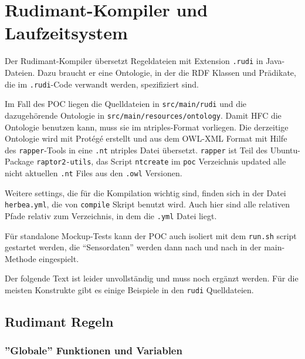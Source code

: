 \section{Rudimant-Kompiler und Laufzeitsystem}

Der Rudimant-Kompiler übersetzt Regeldateien mit Extension \texttt{.rudi} in
Java-Dateien. Dazu braucht er eine Ontologie, in der die RDF Klassen und
Prädikate, die im \texttt{.rudi}-Code verwandt werden, spezifiziert sind.

Im Fall des POC liegen die Quelldateien in \texttt{src/main/rudi} und die
dazugehörende Ontologie in \texttt{src/main/resources/ontology}. Damit HFC
die Ontologie benutzen kann, muss sie im ntriples-Format vorliegen. Die
derzeitige Ontologie wird mit Protégé erstellt und aus dem OWL-XML Format
mit Hilfe des \texttt{rapper}-Tools in eine \texttt{.nt} ntriples Datei
übersetzt. \texttt{rapper} ist Teil des Ubuntu-Package \texttt{raptor2-utils},
das Script \texttt{ntcreate} im \texttt{poc} Verzeichnis updated alle nicht
aktuellen \texttt{.nt} Files aus den \texttt{.owl} Versionen.

Weitere settings, die für die Kompilation wichtig sind, finden sich in der
Datei \texttt{herbea.yml}, die von \texttt{compile} Skript benutzt wird. Auch
hier sind alle relativen Pfade relativ zum Verzeichnis, in dem die
\texttt{.yml} Datei liegt.

Für standalone Mockup-Tests kann der POC auch isoliert mit dem \texttt{run.sh}
script gestartet werden, die ``Sensordaten'' werden dann nach und nach in
der main-Methode eingespielt.

Der folgende Text ist leider unvollständig und muss noch ergänzt werden. Für
die meisten Konstrukte gibt es einige Beispiele in den \texttt{rudi}
Quelldateien.

\subsection{Rudimant Regeln}


\subsubsection{''Globale'' Funktionen und Variablen} \label{rudimant-global}

